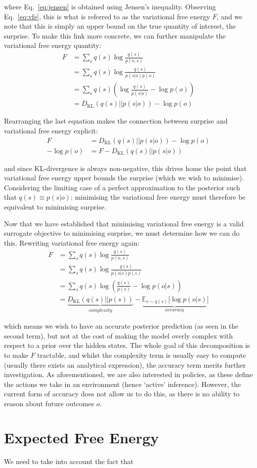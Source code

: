 \documentclass{article}
\newcommand{\KL}{\text{KL}}
\begin{document}
where Eq.\ \ref{eq:jensen} is obtained using Jensen's inequality. Observing Eq.\ \ref{eq:vfe}, this is what is referred to as the variational free energy $F$, and we note that this is simply an upper bound on the true quantity of interest, the surprise. To make this link more concrete, we can further manipulate the variational free energy quantity:
\begin{align}
    F &= \sum_s q(s) \log \frac{q(s)}{p(o,s)}\\
      &= \sum_s q(s) \log \frac{q(s)}{p(s|o)p(o)}\\
      &= \sum_s q(s) \left( \log \frac{q(s)}{p(s|o)} - \log p(o)\right)\\
      &= D_\KL(q(s)||p(s|o)) - \log p(o)
\end{align}

Rearranging the last equation makes the connection between surprise and variational free energy explicit:
\begin{align}
    F &= D_\KL(q(s)||p(s|o)) - \log p(o) \label{eq:vfe2}\\
    - \log p(o) &= F - D_\KL(q(s)||p(s|o))
\end{align}

and since KL-divergence is always non-negative, this drives home the point that variational free energy upper bounds the surprise (which we wish to minimise). Considering the limiting case of a perfect approximation to the posterior such that $q(s) \equiv p(s|o)$; minimising the variational free energy must therefore be equivalent to minimising surprise.

Now that we have established that minimising variational free energy is a valid surrogate objective to minimising surprise, we must determine how we can do this. Rewriting variational free energy again:
\begin{align}
    F &= \sum_s q(s) \log \frac{q(s)}{p(o,s)}\\
      &= \sum_s q(s) \log \frac{q(s)}{p(o|s)p(s)}\\
      &= \sum_s q(s) \log \left( \frac{q(s)}{p(s)} - \log p(o|s) \right)\\
      &= \underbrace{D_\KL(q(s)||p(s))}_{complexity} - \underbrace{\mathbb{E}_{s\sim q(s)}[\log p(o|s)}_{accuracy}]
\end{align}

which means we wish to have an accurate posterior prediction (as seen in the second term), but not at the cost of making the model overly complex with respect to a prior over the hidden states. The whole goal of this decomposition is to make $F$ tractable, and whilst the complexity term is usually easy to compute (usually there exists an analytical expression), the accuracy term merits further investigation. As aforementioned, we are also interested in policies, as these define the actions we take in an environment (hence `active' inference). However, the current form of accuracy does not allow us to do this, as there is no ability to reason about future outcomes $o$. 

\section{Expected Free Energy}

We need to take into account the fact that 
\end{document}

